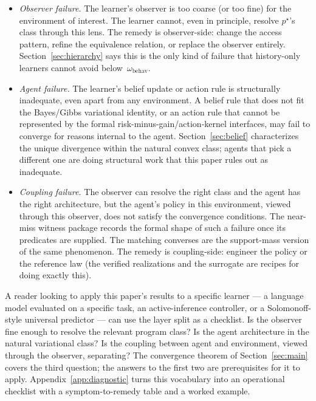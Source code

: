 \documentclass[11pt]{article}
\theoremstyle{definition}
\theoremstyle{remark}
\theoremstyle{plain}
\theoremstyle{definition}
\begin{document}
\begin{itemize}
\item \emph{Observer failure.} The learner's observer is too coarse (or too fine) for the environment of interest. The learner cannot, even in principle, resolve $p^\star$'s class through this lens. The remedy is observer-side: change the access pattern, refine the equivalence relation, or replace the observer entirely. Section~\ref{sec:hierarchy} says this is the only kind of failure that history-only learners cannot avoid below~$\omega_{\mathrm{behav}}$.
\item \emph{Agent failure.} The learner's belief update or action rule is structurally inadequate, even apart from any environment. A belief rule that does not fit the Bayes/Gibbs variational identity, or an action rule that cannot be represented by the formal risk-minus-gain/action-kernel interfaces, may fail to converge for reasons internal to the agent. Section~\ref{sec:belief} characterizes the unique divergence within the natural convex class; agents that pick a different one are doing structural work that this paper rules out as inadequate.
\item \emph{Coupling failure.} The observer can resolve the right class and the agent has the right architecture, but the agent's policy in this environment, viewed through this observer, does not satisfy the convergence conditions. The near-miss witness package records the formal shape of such a failure once its predicates are supplied. The matching converses are the support-mass version of the same phenomenon. The remedy is coupling-side: engineer the policy or the reference law (the verified realizations and the surrogate are recipes for doing exactly this).
\end{itemize}

A reader looking to apply this paper's results to a specific learner --- a language model evaluated on a specific task, an active-inference controller, or a Solomonoff-style universal predictor --- can use the layer split as a checklist. Is the observer fine enough to resolve the relevant program class? Is the agent architecture in the natural variational class? Is the coupling between agent and environment, viewed through the observer, separating? The convergence theorem of Section~\ref{sec:main} covers the third question; the answers to the first two are prerequisites for it to apply. Appendix~\ref{app:diagnostic} turns this vocabulary into an operational checklist with a symptom-to-remedy table and a worked example.
\end{document}
